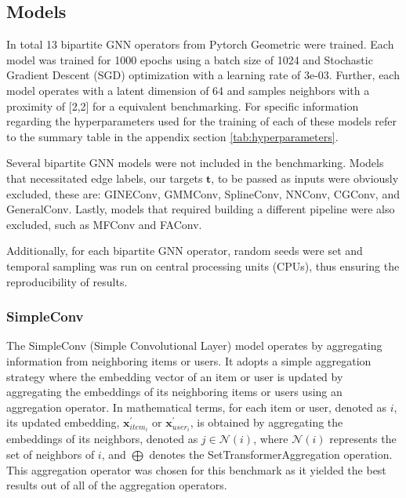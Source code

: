 \documentclass[bst/sn-nature]{sn-jnl}
\begin{document}
\begin{multicols}{2}
\subsection{Models}

\quad In total 13 bipartite GNN operators from Pytorch Geometric were trained. Each model was trained for 1000 epochs using a batch size of 1024 and Stochastic Gradient Descent (SGD) optimization with a learning rate of 3e-03. Further, each model operates with a latent dimension of 64 and samples neighbors with a proximity of [2,2] for a equivalent benchmarking. For specific information regarding the hyperparameters used for the training of each of these models refer to the summary table in the appendix section \ref{tab:hyperparameters}.

Several bipartite GNN models were not included in the benchmarking. Models that necessitated edge labels, our targets $\mathbf{t}$, to be passed as inputs were obviously excluded, these are: GINEConv\cite{gineconv}, GMMConv\cite{gmmconv}, SplineConv\cite{splineconv}, NNConv\cite{nnconv}, CGConv\cite{cgconv}, and GeneralConv\cite{generalconv}. Lastly, models that required building a different pipeline were also excluded, such as MFConv\cite{mfconv} and FAConv\cite{faconv}.

Additionally, for each bipartite GNN operator, random seeds were set and temporal sampling was run on central processing units (CPUs), thus ensuring the reproducibility of results.


\subsubsection{SimpleConv}

\quad The SimpleConv (Simple Convolutional Layer) model operates by aggregating information from neighboring items or users. It adopts a simple aggregation strategy where the embedding vector of an item or user is updated by aggregating the embeddings of its neighboring items or users using an aggregation operator. In mathematical terms, for each item or user, denoted as $i$, its updated embedding, $\mathbf{x}^{\prime}_{item_i}$ or $\mathbf{x}^{\prime}_{user_i}$, is obtained by aggregating the embeddings of its neighbors, denoted as $j \in \mathcal{N}(i)$, where $\mathcal{N}(i)$ represents the set of neighbors of $i$, and $\bigoplus$ denotes the SetTransformerAggregation\cite{simpleconv} operation. This aggregation operator was chosen for this benchmark as it yielded the best results out of all of the aggregation operators. \\ 


\end{multicols}
\end{document}

